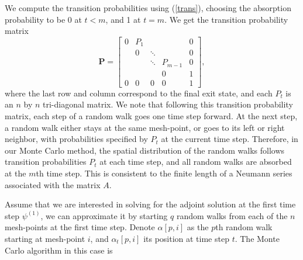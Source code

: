 \documentclass[a4paper,11pt]{article}
\theoremstyle{remark}
\theoremstyle{definition}
\begin{document}
    We compute the transition probabilities using (\ref{trans}), choosing
    the absorption probability to be 0 at $t<m$, and 1 at $t=m$.  We get the
    transition probability matrix
    \[ \mathbf{P} =
    \begin{bmatrix}
    0 & P_1 &        &         & 0 \\
      & 0   & \ddots &         & 0 \\
      &     & \ddots & P_{m-1} & 0 \\
      &     &        & 0       & 1 \\
    0 & 0   & 0      & 0       & 1
    \end{bmatrix} , \]
    where the last row and column correspond to the final exit state,
    and each $P_t$ is an $n$ by $n$ tri-diagonal matrix.  We note that
    following this transition probability matrix, each step of a random
    walk goes one time step forward.  At the next step, a random walk
    either stays at the same mesh-point, or goes to its left or right
    neighbor, with probabilities specified by $P_t$ at the current
    time step.  Therefore, in our Monte Carlo method, the spatial
    distribution of the random walks follows transition probabilities
    $P_t$ at each time step, and all random walks are absorbed at the
    $m$th time step.  This is consistent to the finite length of a
    Neumann series associated with the matrix $A$.
    
    Assume that we are interested in solving for the adjoint solution at
    the first time step $\psi^{(1)}$, we can approximate it by starting
    $q$ random walks from each of the $n$ mesh-points at the first
    time step.  Denote $\alpha[p,i]$ as the $p$th random walk starting at
    mesh-point $i$, and $\alpha_t[p,i]$ its position at time step $t$.
    The Monte Carlo algorithm in this case is
    
\end{document}
